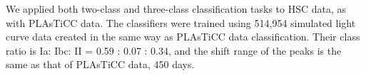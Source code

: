\documentclass[useamsfonts]{pasj01}
\begin{document}
%
%
\begin{table}[ht]
\label{tab:HSCsurvey_schedule}
\end{table}
%

We applied both two-class and three-class classification tasks to HSC data, as with PLAsTiCC data.
The classifiers were trained using 514,954 simulated light curve data created in the same way as PLAsTiCC data classification.
Their class ratio is Ia: Ibc: II = 0.59 : 0.07 : 0.34, and the shift range of the peaks is the same as that of PLAsTiCC data, 450 days.
%
\end{document}
